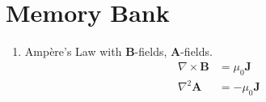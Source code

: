 \documentclass[12pt]{article}
\begin{document}
\maketitle
\small
\section{Memory Bank}
\begin{enumerate}
\item Amp\`{e}re's Law with $\mathbf{B}$-fields, $\mathbf{A}$-fields.
\begin{align}
\nabla \times \mathbf{B} &= \mu_0 \mathbf{J} \label{eq:1} \\
\nabla^2 \mathbf{A} &= -\mu_0 \mathbf{J} \label{eq:2} 
\end{align}
\end{enumerate}
\end{document}
